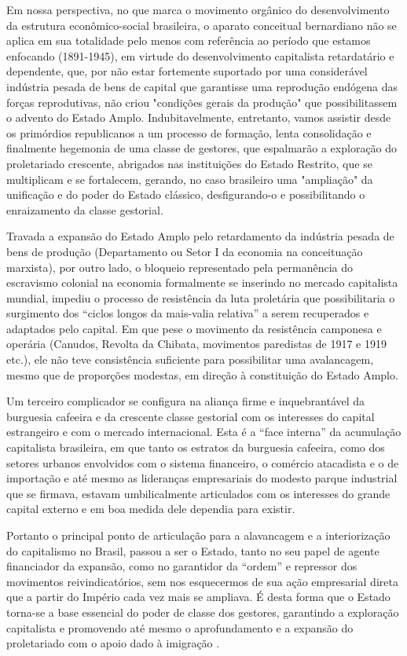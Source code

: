 \begin{citacao}
Em nossa perspectiva, no que marca o movimento orgânico do desenvolvimento da estrutura econômico-social brasileira, o aparato conceitual bernardiano não se aplica em sua totalidade pelo menos com referência ao período que estamos enfocando (1891-1945), em virtude do desenvolvimento capitalista retardatário e dependente, que, por não estar fortemente suportado por uma considerável indústria pesada de bens de capital que garantisse uma reprodução endógena das forças reprodutivas, não criou "condições gerais da produção" que possibilitassem o advento do Estado Amplo. Indubitavelmente, entretanto, vamos assistir desde os primórdios republicanos a um processo de formação, lenta consolidação e finalmente hegemonia de uma classe de gestores, que espalmarão a exploração do proletariado crescente, abrigados nas instituições do Estado Restrito, que se multiplicam e se fortalecem, gerando, no caso brasileiro uma "ampliação" da unificação e do poder do Estado clássico, desfigurando-o e possibilitando o enraizamento da classe gestorial.

Travada a expansão do Estado Amplo pelo retardamento da indústria pesada de bens de produção (Departamento ou Setor I da economia na conceituação marxista), por outro lado, o bloqueio representado pela permanência do escravismo colonial na economia formalmente se inserindo no mercado capitalista mundial, impediu o processo de resistência da luta proletária que possibilitaria o  surgimento dos ``ciclos longos 
da mais-valia relativa'' a serem recuperados e adaptados pelo capital. Em que pese o movimento da resistência camponesa e operária (Canudos, Revolta da Chibata, movimentos paredistas de 1917 e 1919 etc.), ele não teve consistência suficiente para possibilitar uma avalancagem, mesmo que de proporções modestas, em direção à constituição do Estado Amplo. 

Um terceiro complicador se configura na aliança firme e inquebrantável da burguesia cafeeira e da crescente classe gestorial com os interesses do capital estrangeiro e com o mercado internacional. Esta é a ``face interna'' da acumulação capitalista brasileira, em que tanto os estratos da burguesia cafeeira, como dos setores urbanos envolvidos com o sistema financeiro, o comércio atacadista e o de importação e até mesmo as lideranças empresariais do modesto parque industrial que se firmava, estavam umbilicalmente articulados com os interesses do grande capital externo e em boa medida dele dependia para existir.

Portanto o principal ponto de articulação para a alavancagem e a interiorização do capitalismo no Brasil, passou a ser o Estado, tanto no seu papel de agente financiador da expansão, como no garantidor da ``ordem'' e repressor dos movimentos reivindicatórios, sem nos esquecermos de sua ação empresarial direta que a partir do Império cada vez mais se ampliava. É desta forma que o Estado torna-se a base essencial do poder de classe dos gestores, garantindo a exploração capitalista e promovendo até mesmo o aprofundamento e a expansão do proletariado com o apoio dado à imigração \cite[pp.~104-105]{doin_bernardo_1996}.
\end{citacao}

